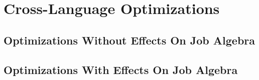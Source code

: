 \section{Cross-Language Optimizations}

\subsection{Optimizations Without Effects On Job Algebra}

\subsection{Optimizations With Effects On Job Algebra}
